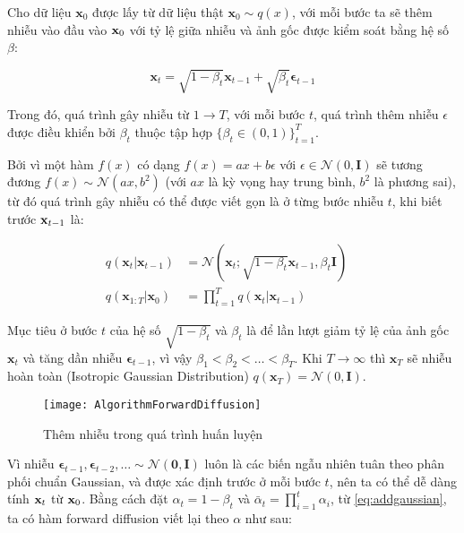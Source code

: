 Cho dữ liệu $\mathbf{x}_{0}$ được lấy từ dữ liệu thật $\mathbf{x}_{0} \sim q(x)$, với mỗi bước ta sẽ thêm nhiễu vào đầu vào $\mathbf{x}_{0}$ với tỷ lệ giữa nhiễu và ảnh gốc được kiểm soát bằng hệ số $\beta$:


\begin{equation}
	\label{eq:addgaussian}
	\mathbf{x}_t = \sqrt{1 - \beta_t}\mathbf{x}_{t-1} + \sqrt{\beta_t} \boldsymbol{\epsilon}_{t-1}
\end{equation}


Trong đó, quá trình gây nhiễu từ $1 \to T$, với mỗi bước $t$, quá trình thêm nhiễu $\epsilon$ được điều khiển bởi $\beta_t$ thuộc tập hợp $\{\beta_t \in (0, 1)\}_{t=1}^T$.

Bởi vì một hàm $f(x)$ có dạng $f(x) = a x + b\epsilon$ với $\epsilon \in \mathcal{N}(0, \mathbf{I})$ sẽ tương đương $f(x) \sim \mathcal{N}(a x, b^2)$ (với $a x$ là kỳ vọng hay trung bình, $b^2$ là phương sai), từ đó quá trình gây nhiễu có thể được viết gọn là ở từng bước nhiễu $t$, khi biết trước $\mathbf{x}_{t-1}$ là:

\begin{equation}
	\label{eq:forward_diffusion_process}
	\begin{aligned}
		q(\mathbf{x}_t \vert \mathbf{x}_{t-1}) &= \mathcal{N}(\mathbf{x}_t; \sqrt{1 - \beta_t} \mathbf{x}_{t-1}, \beta_t\mathbf{I}) \quad \\
		q(\mathbf{x}_{1:T} \vert \mathbf{x}_0) &= \prod^T_{t=1} q(\mathbf{x}_t \vert \mathbf{x}_{t-1})
	\end{aligned}
\end{equation}

Mục tiêu ở bước $t$ của hệ số $\sqrt{1 - \beta_t}$ và $\beta_t$ là để lần lượt giảm tỷ lệ của ảnh gốc $\mathbf{x}_t$ và tăng dần nhiễu  $\boldsymbol{\epsilon}_{t-1}$, vì vậy $\beta_1 < \beta_2 < \dots < \beta_T$. Khi $T \to \infty$ thì $\mathbf{x}_{T}$ sẽ nhiễu hoàn toàn \cite{weng2021diffusion} (Isotropic Gaussian Distribution) $q(\mathbf{x}_{T}) = \mathcal{N} (0, \mathbf{I})$.

\begin{figure}[H]
	\centering
	\texttt{[image: AlgorithmForwardDiffusion]}
	\caption{Thêm nhiễu trong quá trình huấn luyện}
	\label{fig:AlgorithmForwardDiffusion}
\end{figure}

Vì nhiễu $\boldsymbol{\epsilon}_{t-1}, \boldsymbol{\epsilon}_{t-2}, \dots \sim \mathcal{N}(\mathbf{0}, \mathbf{I})$ luôn là các biến ngẫu nhiên tuân theo phân phối chuẩn Gaussian, và được xác định trước ở mỗi bước $t$, nên ta có thể dễ dàng tính $\mathbf{x}_t$ từ $\mathbf{x}_0$. Bằng cách đặt $\alpha_t = 1 - \beta_t$ và $\bar{\alpha}_t = \prod_{i=1}^t \alpha_i$, từ \autoref{eq:addgaussian}, ta có hàm forward diffusion viết lại theo $\alpha$ như sau:

